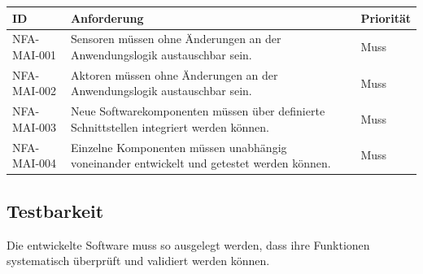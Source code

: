 \documentclass[
  a4paper,
  12pt,
  DIV=12,        %
  parskip=half,  %
  headings=small %
]{scrartcl}
\theoremstyle{definition}
\theoremstyle{definition}
\begin{document}
\begin{longtable}[]{@{}
  >{\raggedright\arraybackslash}p{}
  >{\raggedright\arraybackslash}p{}
  >{\raggedright\arraybackslash}p{}@{}}
\toprule\noalign{}
\begin{minipage}[b]{\linewidth}\raggedright
ID
\end{minipage} & \begin{minipage}[b]{\linewidth}\raggedright
Anforderung
\end{minipage} & \begin{minipage}[b]{\linewidth}\raggedright
Priorität
\end{minipage} \\
\midrule\noalign{}
\endhead
\bottomrule\noalign{}
\endlastfoot
NFA-MAI-001 & Sensoren müssen ohne Änderungen an der Anwendungslogik
austauschbar sein. & Muss \\
NFA-MAI-002 & Aktoren müssen ohne Änderungen an der Anwendungslogik
austauschbar sein. & Muss \\
NFA-MAI-003 & Neue Softwarekomponenten müssen über definierte
Schnittstellen integriert werden können. & Muss \\
NFA-MAI-004 & Einzelne Komponenten müssen unabhängig voneinander
entwickelt und getestet werden können. & Muss \\
\end{longtable}

\subsection{Testbarkeit}\label{testbarkeit}

Die entwickelte Software muss so ausgelegt werden, dass ihre Funktionen
systematisch überprüft und validiert werden können.
\end{document}
